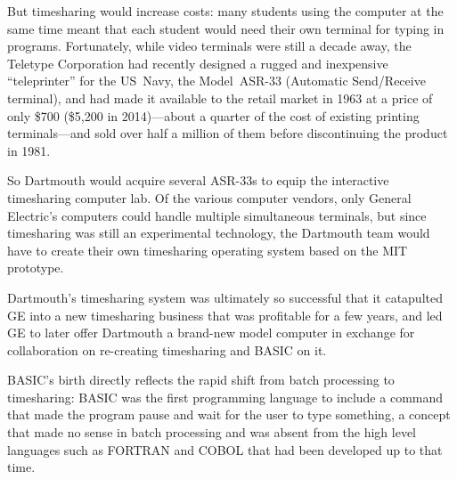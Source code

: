 But timesharing would increase costs:
many students using the computer at the same time meant that each student
would need their own terminal for typing in programs.
Fortunately, while video terminals were still a decade away, 
the Teletype Corporation had recently designed a rugged and
inexpensive ``teleprinter'' for the US~Navy, the Model~ASR-33 (Automatic
Send/Receive terminal), and had made it
available to the retail market in 1963 at a price of only \$700 (\$5,200
in 2014)---about a quarter of the cost of existing printing
terminals---and sold over
half a million of them before discontinuing the product in 1981.



So Dartmouth would acquire several ASR-33s to equip the interactive
timesharing computer lab.
Of the various computer vendors, only General Electric's computers could
handle multiple simultaneous terminals,
but since timesharing was still an experimental technology, the Dartmouth
team would have to create their own timesharing operating system based
on the MIT prototype.

\begin{tangent}
Dartmouth's timesharing system was ultimately so successful that it
catapulted GE into a new timesharing business that was profitable for a
few years, and led GE to later offer Dartmouth a brand-new model
computer in exchange for collaboration on re-creating timesharing and
BASIC on it.
\end{tangent}

BASIC's birth directly reflects the rapid shift from batch processing to
timesharing: 
BASIC was the first programming language to include a command that made
the program pause and wait for the user to type
something, a concept that made no sense in batch processing and was
absent from the high level languages such as FORTRAN and COBOL that had
been developed up to that time.
 
